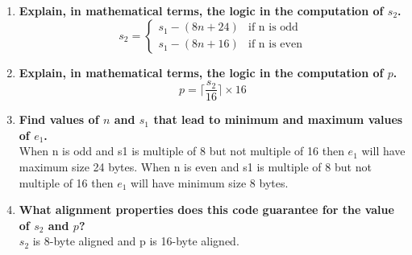 \documentclass{article}
\begin{document}
\begin{enumerate}[label=\textbf{\Alph*.}]
	\item \textbf{Explain, in mathematical terms, the logic in the computation of $s_2$.} \\
	\[
	s_2 =
	\begin{cases}
		s_1 - (8n + 24) & \text{if n is odd} \\
		s_1 - (8n + 16) & \text{if n is even}
	\end{cases}
	\]
	\item \textbf{Explain, in mathematical terms, the logic in the computation of $p$.} \\
	\[
	p = \lceil \frac{s_2}{16} \rceil \times 16
	\]
	\item \textbf{Find values of $n$ and $s_1$ that lead to minimum and maximum values of $e_1$.} \\
	When n is odd and s1 is multiple of 8 but not multiple of 16 then $e_1$ will have
	maximum size 24 bytes.
	When n is even and s1 is multiple of 8 but not multiple of 16
	then $e_1$ will have minimum size 8 bytes.
	\item \textbf{What alignment properties does this code guarantee for the value
	of $s_2$ and $p$?} \\
	$s_2$ is 8-byte aligned and p is 16-byte aligned.

\end{enumerate}
\end{document}
